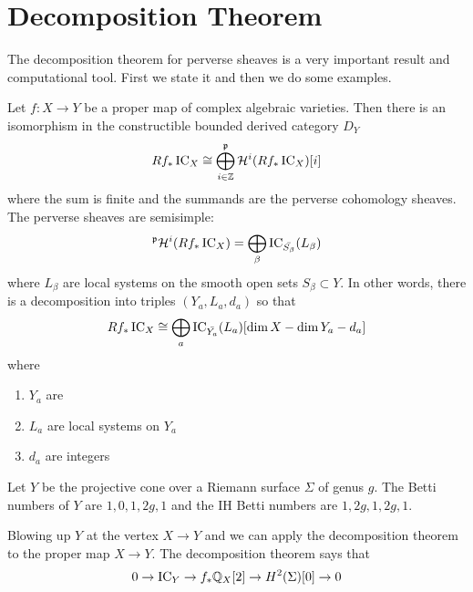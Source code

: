 \documentclass[12pt]{article}
\begin{document}
\section{Decomposition Theorem}
The decomposition theorem for perverse sheaves is a very 
important result and computational tool. First we state it and then we do 
some examples.

\begin{theorem}
    Let $f:X\to Y$ be a proper map of complex algebraic varieties. Then
    there is an isomorphism in the constructible bounded derived category $D_Y$ \begin{align*}
        Rf_*\operatorname{IC}_X \cong \bigoplus_{i\in \mathbb{Z}} ^{\mathfrak{p}}{\mathcal{H}}^i(Rf_*\operatorname{IC}_X)[i]
    \end{align*} where the sum is finite and the summands are the perverse cohomology sheaves.
    The perverse sheaves are semisimple: \begin{align*}
        ^{\mathfrak{p}}{\mathcal{H}}^i(Rf_*\operatorname{IC}_X) = \bigoplus_\beta \operatorname{IC}_{\bar{S_\beta}}(L_\beta)
    \end{align*} where $L_\beta$ are local systems on the smooth open sets 
    $S_\beta \subset Y$. 
    In other words, there is a  
    decomposition into triples $(Y_a,L_a,d_a)$ so that \begin{align*}
        Rf_*\operatorname{IC}_X \cong \bigoplus_a \operatorname{IC}_{\bar{Y_a}}(L_a)[\dim X - \dim Y_a - d_a]
    \end{align*} where \begin{enumerate}
        \item $Y_a$ are 
        \item $L_a$ are local systems on $Y_a$
        \item $d_a$ are integers
    \end{enumerate}
\end{theorem}

\begin{example}
    Let $Y$ be the projective cone over a Riemann surface $\Sigma$ of genus $g$.
    The Betti numbers of $Y$ are $1,0,1,2g,1$ and the IH Betti numbers are $1,2g,1,2g,1$.

    \hfill 

    Blowing up $Y$ at the vertex $X\to Y$ and we can apply the decomposition theorem to the
    proper map $X\to Y$. The decomposition theorem says that \begin{align*}
        0 \to \operatorname{IC}_Y \to f_*\mathbb{Q}_X[2] \to H^2(\Sigma)[0]\to 0
    \end{align*}
\end{example}
\end{document}
